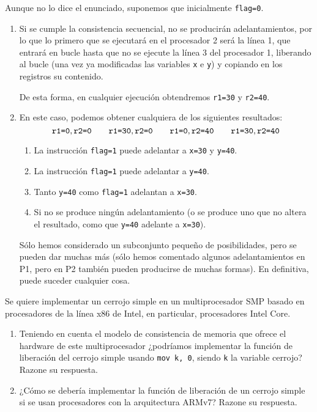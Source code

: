 \begin{ejercicio}
Aunque no lo dice el enunciado, suponemos que inicialmente \verb|flag=0|.
\begin{enumerate}
    \item Si se cumple la consistencia secuencial, no se producirán adelantamientos, por lo que lo primero que se ejecutará en el procesador 2 será la línea 1, que entrará en bucle hasta que no se ejecute la línea 3 del procesador 1, liberando al bucle (una vez ya modificadas las variables \verb|x| e \verb|y|) y copiando en los registros su contenido.

        De esta forma, en cualquier ejecución obtendremos \verb|r1=30| y \verb|r2=40|.

    \item En este caso, podemos obtener cualquiera de los siguientes resultados:
        \begin{equation*}
            \verb|r1=0|, \verb|r2=0| \qquad \verb|r1=30|, \verb|r2=0| \qquad \verb|r1=0|, \verb|r2=40| \qquad \verb|r1=30|, \verb|r2=40|
        \end{equation*}
        \begin{enumerate}
            \item La instrucción \verb|flag=1| puede adelantar a \verb|x=30| y \verb|y=40|.
            \item La instrucción \verb|flag=1| puede adelantar a \verb|y=40|.
            \item Tanto \verb|y=40| como \verb|flag=1| adelantan a \verb|x=30|.
            \item Si no se produce ningún adelantamiento (o se produce uno que no altera el resultado, como que \verb|y=40| adelante a \verb|x=30|).
        \end{enumerate}
        Sólo hemos considerado un subconjunto pequeño de posibilidades, pero se pueden dar muchas más (sólo hemos comentado algunos adelantamientos en P1, pero en P2 también pueden producirse de muchas formas). En definitiva, puede suceder cualquier cosa.
\end{enumerate}

\end{ejercicio}

\begin{ejercicio}
    Se quiere implementar un cerrojo simple en un multiprocesador SMP basado en procesadores de
    la línea x86 de Intel, en particular, procesadores Intel Core. 
    \begin{enumerate}
        \item Teniendo en cuenta el modelo de consistencia de memoria que ofrece el hardware de este multiprocesador ¿podríamos implementar la función de liberación del cerrojo simple usando \verb|mov k, 0|, siendo \verb|k| la variable cerrojo? Razone su respuesta.
        \item ¿Cómo se debería implementar la función de liberación de un cerrojo simple si se usan procesadores con la arquitectura ARMv7? Razone su respuesta.
    \end{enumerate}
\end{ejercicio}

